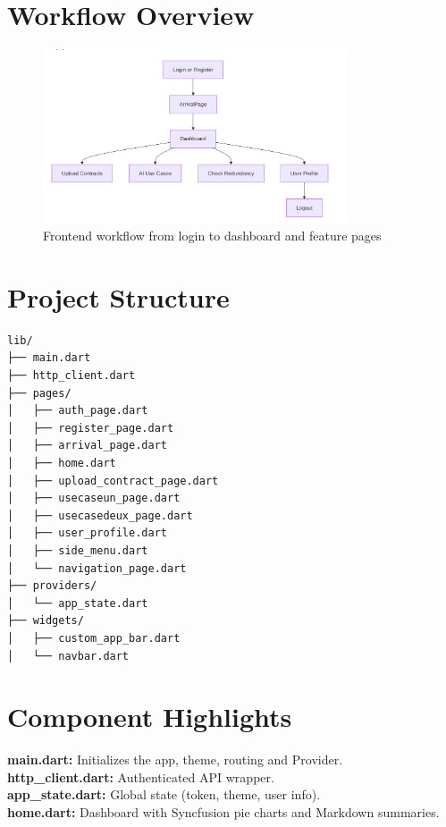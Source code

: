 \section{Workflow Overview}

\begin{figure}[H]
    \centering
    \includegraphics[width=0.8\textwidth]{frontend/workflow_mermaid.png}
    \caption{Frontend workflow from login to dashboard and feature pages}
\end{figure}

\section{Project Structure}

\begin{verbatim}
lib/
├── main.dart
├── http_client.dart
├── pages/
│   ├── auth_page.dart
│   ├── register_page.dart
│   ├── arrival_page.dart
│   ├── home.dart
│   ├── upload_contract_page.dart
│   ├── usecaseun_page.dart
│   ├── usecasedeux_page.dart
│   ├── user_profile.dart
│   ├── side_menu.dart
│   └── navigation_page.dart
├── providers/
│   └── app_state.dart
├── widgets/
│   ├── custom_app_bar.dart
│   └── navbar.dart
\end{verbatim}

\section{Component Highlights}

\textbf{main.dart:} Initializes the app, theme, routing and Provider.\\
\textbf{http\_client.dart:} Authenticated API wrapper.\\
\textbf{app\_state.dart:} Global state (token, theme, user info).\\
\textbf{home.dart:} Dashboard with Syncfusion pie charts and Markdown summaries.

